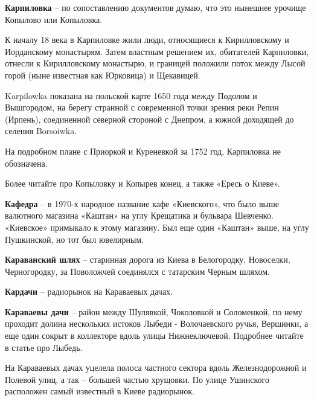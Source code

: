 \medskip


\textbf{Карпиловка} – по сопоставлению документов думаю, что это нынешнее урочище Копылово или Копыловка.

К началу 18 века в Карпиловке жили люди, относящиеся к Кирилловскому и Иорданскому монастырям. Затем властным решением их, обитателей Карпиловки, отнесли к Кирилловскому монастырю, и границей положили поток между Лысой горой (ныне известная как Юрковица) и Щекавицей.

Karpilowka показана на польской карте 1650 года между Подолом и Вышгородом, на берегу странной с современной точки зрения реки Репин (Ирпень), соединенной северной стороной с Днепром, а южной доходящей до селения Borsoiwka. 

На подробном плане с Приоркой и Куреневкой за 1752 год, Карпиловка не обозначена.

Более читайте про Копыловку и Копырев конец, а также «Ересь о Киеве».\\

\medskip

\textbf{Кафедра} – в 1970-х народное название кафе «Киевского», что было выше валютного магазина «Каштан» на углу Крещатика и бульвара Шевченко. «Киевское» примыкало к этому магазину. Был еще один «Каштан» выше, на углу Пушкинской, но тот был ювелирным.\\

\medskip

\textbf{Караванский шлях} – старинная дорога из Киева в Белогородку, Новоселки, Черногородку, за Поволожчей соединялся с татарским Черным шляхом.\\

\medskip

\textbf{Кардачи} – радиорынок на Караваевых дачах.\\

\medskip

\textbf{Караваевы дачи} – район между Шулявкой, Чоколовкой и Соломенкой, по нему проходит долина нескольких истоков Лыбеди - Волочаевского ручья, Вершинки, а еще один сокрыт в коллекторе вдоль улицы Нижнеключевой. Подробнее читайте в статье про Лыбедь. 

На Караваевых дачах уцелела полоса частного сектора вдоль Железнодорожной и Полевой улиц, а так – большей частью хрущовки. По улице Ушинского расположен самый известный в Киеве радиорынок.

